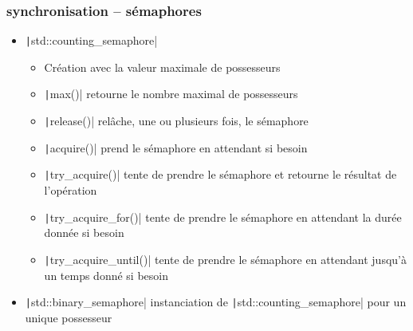 \documentclass[C++.tex]{subfiles}
\begin{document}
\begin{frame}[fragile]
	\frametitle{synchronisation -- sémaphores}
	\begin{itemize}
		\item \texttt|std::counting_semaphore|
		\begin{itemize}
			\item Création avec la valeur maximale de possesseurs
			\item \texttt|max()| retourne le nombre maximal de possesseurs
			\item \texttt|release()| relâche, une ou plusieurs fois, le sémaphore


			\item \texttt|acquire()| prend le sémaphore en attendant si besoin


			\item \texttt|try_acquire()| tente de prendre le sémaphore et retourne le résultat de l'opération


			\item \texttt|try_acquire_for()| tente de prendre le sémaphore en attendant la durée donnée si besoin
			\item \texttt|try_acquire_until()| tente de prendre le sémaphore en attendant jusqu'à un temps donné si besoin
		\end{itemize}
		\item \texttt|std::binary_semaphore|	instanciation de \texttt|std::counting_semaphore| pour un unique possesseur
	\end{itemize}


\end{frame}
\end{document}
